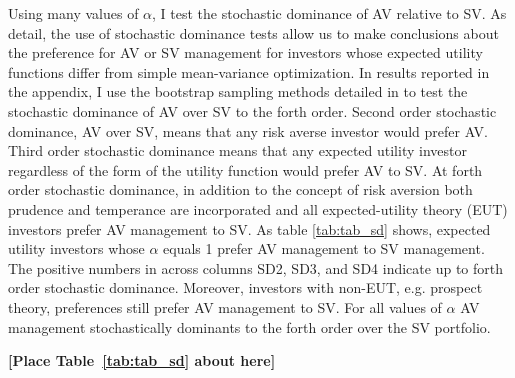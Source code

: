 %	
Using many values of $\alpha$, I test the stochastic dominance of AV relative to SV. As \citet{hadar_rules_1969,hanoch_efficiency_1969,rothschild_increasing_1970,levy_experimental_2002} detail, the use of stochastic dominance tests allow us to make conclusions about the preference for AV or SV management for investors whose expected utility functions differ from simple mean-variance optimization. In results reported in the appendix, I use the bootstrap sampling methods detailed in \citet{vinod_h.d._ranking_2004,vinod_hands-intermediate_2008} to test the stochastic dominance of AV over SV to the forth order. Second order stochastic dominance, AV over SV, means that any risk averse investor would prefer AV. \citep{mcfadden_testing_1989,valle_novel_2017} Third order stochastic dominance means that any expected utility investor regardless of the form of the utility function would prefer AV to SV. \citep{whitmore_third-degree_1970,chan_third_2016} At forth order stochastic dominance, in addition to the concept of risk aversion both prudence and temperance are incorporated and all expected-utility theory (EUT) investors prefer AV management to SV. \citep{kimball_standard_1993,noauthor_risk-aversion_nodate} As table \ref{tab:tab_sd} shows, expected utility investors whose $\alpha$ equals 1 prefer AV management to SV management. The positive numbers in across columns SD2, SD3, and SD4 indicate up to forth order stochastic dominance. Moreover, investors with non-EUT, e.g. prospect theory, preferences still prefer AV management to SV. \citep{kahneman_prospect_1979} For all values of $\alpha$ AV management stochastically dominants to the forth order over the SV portfolio.
%

\bigskip
\centerline{\bf [Place Table~\ref{tab:tab_sd} about here]}
\bigskip


